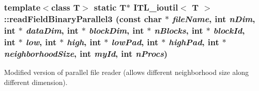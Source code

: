 \hypertarget{classITL__ioutil_a5d591988598d12ecaa2d35bbb60134f4}{
\subsubsection[{readFieldBinaryParallel3}]{\setlength{\rightskip}{0pt plus 5cm}template$<$class T$>$ static T$\ast$ {\bf ITL\_\-ioutil}$<$ T $>$::readFieldBinaryParallel3 (const char $\ast$ {\em fileName}, \/  int {\em nDim}, \/  int $\ast$ {\em dataDim}, \/  int $\ast$ {\em blockDim}, \/  int $\ast$ {\em nBlocks}, \/  int $\ast$ {\em blockId}, \/  int $\ast$ {\em low}, \/  int $\ast$ {\em high}, \/  int $\ast$ {\em lowPad}, \/  int $\ast$ {\em highPad}, \/  int $\ast$ {\em neighborhoodSize}, \/  int {\em myId}, \/  int {\em nProcs})}}
\label{classITL__ioutil_a5d591988598d12ecaa2d35bbb60134f4}


Modified version of parallel file reader (allows different neighborhood size along different dimension). 

